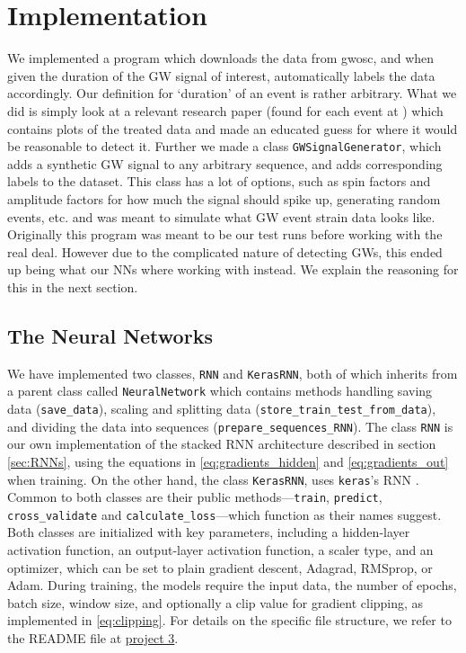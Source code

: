 \documentclass[%
reprint,
amsmath,amssymb,
aps,
]{revtex4-2}
\begin{document}
\section{Implementation}
We implemented a program which downloads the data from gwosc, and when given the duration of the GW signal of interest, automatically labels the data accordingly. Our definition for `duration' of an event is rather arbitrary. What we did is simply look at a relevant research paper (found for each event at \cite{gwosc_all_events}) which contains plots of the treated data and made an educated guess for where it would be reasonable to detect it. Further we made a class \texttt{GWSignalGenerator}, which adds a synthetic GW signal to any arbitrary sequence, and adds corresponding labels to the dataset. This class has a lot of options, such as spin factors and amplitude factors for how much the signal should spike up, generating random events, etc. and was meant to simulate what GW event strain data looks like. Originally this program was meant to be our test runs before working with the real deal. However due to the complicated nature of detecting GWs, this ended up being what our NNs where working with instead. We explain the reasoning for this in the next section.

\subsection{The Neural Networks}
We have implemented two classes, \texttt{RNN} and \texttt{KerasRNN}, both of which inherits from a parent class called \texttt{NeuralNetwork} which contains methods handling saving data (\texttt{save\_data}), 
scaling and splitting data (\texttt{store\_train\_test\_from\_data}), and dividing the data into sequences (\texttt{prepare\_sequences\_RNN}). The class \texttt{RNN} is our own implementation of the stacked RNN architecture described in section \ref{sec:RNNs}, using the equations in \eqref{eq:gradients_hidden} and \eqref{eq:gradients_out} when training. On the other hand, the class \texttt{KerasRNN}, uses \texttt{keras}'s RNN \cite{keras_recurrent_layers}. Common to both classes are their public methods—\texttt{train}, \texttt{predict}, \texttt{cross\_validate} and \texttt{calculate\_loss}—which function as their names suggest. Both classes are initialized with key parameters, including a hidden-layer activation function, an output-layer activation function, a scaler type, and an optimizer, which can be set to plain gradient descent, Adagrad, RMSprop, or Adam. During training, the models require the input data, the number of epochs, batch size, window size, and optionally a clip value for gradient clipping, as implemented in \eqref{eq:clipping}. For details on the specific file structure, we refer to the README file at \href{https://github.com/EdvardRornes/FYS-STK4155/tree/main/Project3}{project 3}.
\end{document}
